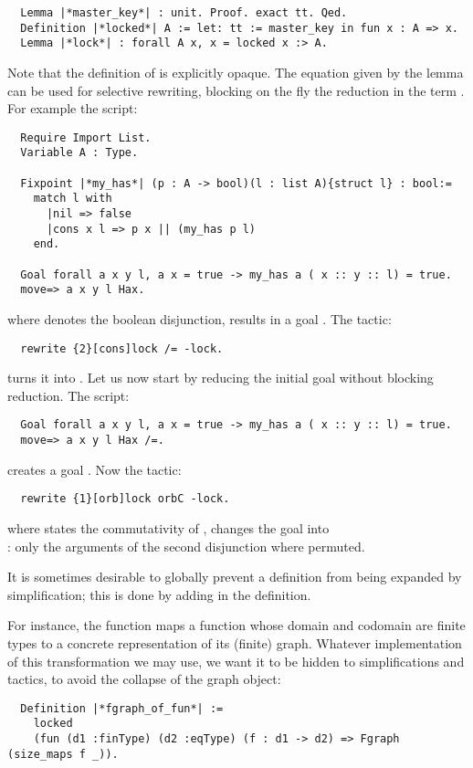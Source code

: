 \begin{lstlisting}
  Lemma |*master_key*| : unit. Proof. exact tt. Qed.
  Definition |*locked*| A := let: tt := master_key in fun x : A => x.
  Lemma |*lock*| : forall A x, x = locked x :> A.
\end{lstlisting}
Note that the definition of  is explicitly opaque.
The equation  given by the  lemma can be used
for selective rewriting, blocking on the fly the reduction in the
term .
For example the script:
\begin{lstlisting}
  Require Import List.
  Variable A : Type.

  Fixpoint |*my_has*| (p : A -> bool)(l : list A){struct l} : bool:=
    match l with
      |nil => false
      |cons x l => p x || (my_has p l)
    end.

  Goal forall a x y l, a x = true -> my_has a ( x :: y :: l) = true.
  move=> a x y l Hax.
\end{lstlisting}
where \ssrL{||} denotes the boolean disjunction, results in a goal
. The tactic:
\begin{lstlisting}
  rewrite {2}[cons]lock /= -lock.
\end{lstlisting}
turns it into .
Let us now start by reducing the initial goal without blocking reduction.
The script:
\begin{lstlisting}
  Goal forall a x y l, a x = true -> my_has a ( x :: y :: l) = true.
  move=> a x y l Hax /=.
\end{lstlisting}
creates a goal . Now the
tactic:
\begin{lstlisting}
  rewrite {1}[orb]lock orbC -lock.
\end{lstlisting}
where  states the commutativity of , changes the
goal into\\ : only the
arguments of the second disjunction where permuted.


It is sometimes desirable to globally prevent a definition from being
expanded by simplification; this is done by adding  in the
definition.

For instance, the function  maps a function whose
domain and codomain are finite types to a concrete representation of
its (finite) graph. Whatever implementation of this transformation we
may use, we want it to be hidden to simplifications and tactics, to
avoid the collapse of the graph object:
\begin{lstlisting}
  Definition |*fgraph_of_fun*| :=
    locked
    (fun (d1 :finType) (d2 :eqType) (f : d1 -> d2) => Fgraph (size_maps f _)).
\end{lstlisting}

